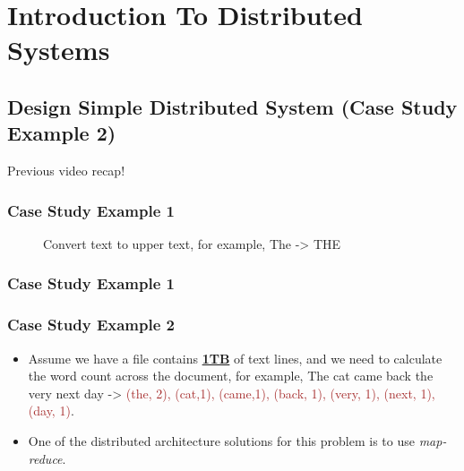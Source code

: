 \section{Introduction To Distributed Systems}
%
\subsection{Design Simple Distributed System (Case Study Example 2)}

\begin{frame}[c]{ }
	\centering     
	
	\textcolor{offgreen}{ \large Previous video recap!}
\end{frame}

\begin{frame}[plain,c]
	\frametitle{Case Study Example 1}
	\begin{figure}
		\centering
		
		\caption{Convert text to upper text, for example, The -> THE } \label{fig:DS3}
	\end{figure}
	
\end{frame}
\begin{frame}[plain,c]
	\frametitle{Case Study Example 1}
	\begin{figure}
		\centering
		
	\end{figure}
	
\end{frame}
\begin{frame}
	\frametitle{Case Study Example 2}
	\begin{itemize}  [<+->]
		\item Assume we have a file contains \textbf{\underline{1TB}} of text lines, and we need to calculate the word count across the document, for example, \textcolor{offyellow}{The cat came back the very next day} -> \textcolor{brown}{(the, 2), (cat,1), (came,1), (back, 1), (very, 1), (next, 1), (day, 1)}.

		\item One of the distributed architecture solutions for this problem is to use \textcolor{offyellow}{\textit{map-reduce}}.
	\end{itemize}
\end{frame}


